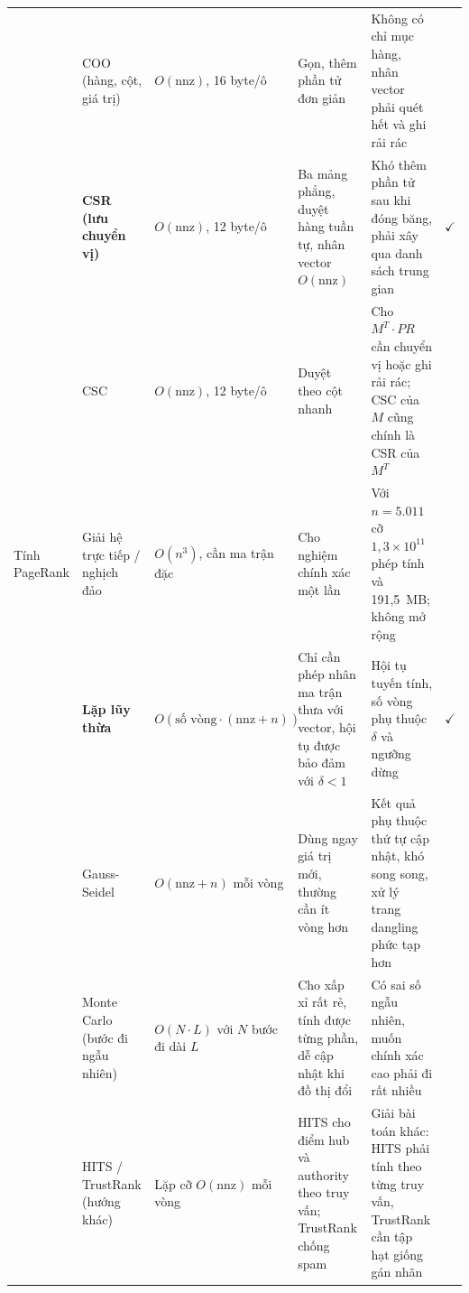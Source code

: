\documentclass[9pt,twocolumn,a4paper]{extarticle}
\begin{document}
\begin{table}[!t]
\begin{tabular}{@{}p{1.7cm}p{2.7cm}p{2.6cm}p{4.3cm}p{4.7cm}p{0.8cm}@{}}
 & COO (hàng, cột, giá trị) & $O(\text{nnz})$, 16 byte/ô & Gọn, thêm phần tử đơn giản & Không có chỉ mục hàng, nhân vector phải quét hết và ghi rải rác & \\
 & \textbf{CSR (lưu chuyển vị)} & $O(\text{nnz})$, 12 byte/ô & Ba mảng phẳng, duyệt hàng tuần tự, nhân vector $O(\text{nnz})$ & Khó thêm phần tử sau khi đóng băng, phải xây qua danh sách trung gian & $\checkmark$ \\
 & CSC & $O(\text{nnz})$, 12 byte/ô & Duyệt theo cột nhanh & Cho $M^{T}\!\cdot PR$ cần chuyển vị hoặc ghi rải rác; CSC của $M$ cũng chính là CSR của $M^{T}$ & \\
\midrule
Tính PageRank
 & Giải hệ trực tiếp / nghịch đảo & $O(n^3)$, cần ma trận đặc & Cho nghiệm chính xác một lần & Với $n=5.011$ cỡ $1{,}3\times10^{11}$ phép tính và 191,5~MB; không mở rộng & \\
 & \textbf{Lặp lũy thừa} \cite{brin1998} & $O(\text{số vòng}\cdot(\text{nnz}+n))$ & Chỉ cần phép nhân ma trận thưa với vector, hội tụ được bảo đảm với $\delta<1$ & Hội tụ tuyến tính, số vòng phụ thuộc $\delta$ và ngưỡng dừng & $\checkmark$ \\
 & Gauss-Seidel & $O(\text{nnz}+n)$ mỗi vòng & Dùng ngay giá trị mới, thường cần ít vòng hơn & Kết quả phụ thuộc thứ tự cập nhật, khó song song, xử lý trang dangling phức tạp hơn & \\
 & Monte Carlo (bước đi ngẫu nhiên) & $O(N\cdot L)$ với $N$ bước đi dài $L$ & Cho xấp xỉ rất rẻ, tính được từng phần, dễ cập nhật khi đồ thị đổi & Có sai số ngẫu nhiên, muốn chính xác cao phải đi rất nhiều & \\
 & HITS / TrustRank (hướng khác) & Lặp cỡ $O(\text{nnz})$ mỗi vòng & HITS cho điểm hub và authority theo truy vấn; TrustRank chống spam & Giải bài toán khác: HITS phải tính theo từng truy vấn, TrustRank cần tập hạt giống gán nhãn & \\
\bottomrule
\end{tabular}
\end{table}
\end{document}

